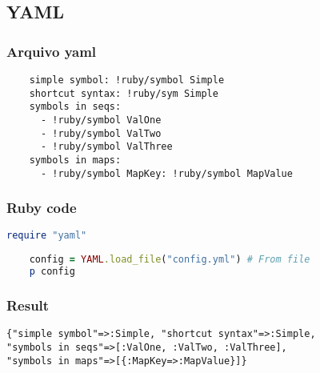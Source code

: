 \documentclass[serif,mathserif]{article}
\begin{document}
\subsection{YAML}

\subsubsection{Arquivo yaml}

\begin{verbatim}
	simple symbol: !ruby/symbol Simple 
	shortcut syntax: !ruby/sym Simple 
	symbols in seqs: 
	  - !ruby/symbol ValOne 
	  - !ruby/symbol ValTwo 
	  - !ruby/symbol ValThree 
	symbols in maps: 
	  - !ruby/symbol MapKey: !ruby/symbol MapValue 
\end{verbatim}

\subsubsection{Ruby code}

\begin{lstlisting}[language=ruby]
	require "yaml"
	
	config = YAML.load_file("config.yml") # From file
	p config
\end{lstlisting}

\subsubsection{Result}

\begin{verbatim}
{"simple symbol"=>:Simple, "shortcut syntax"=>:Simple, 
"symbols in seqs"=>[:ValOne, :ValTwo, :ValThree], 
"symbols in maps"=>[{:MapKey=>:MapValue}]}
\end{verbatim}




\end{document}
